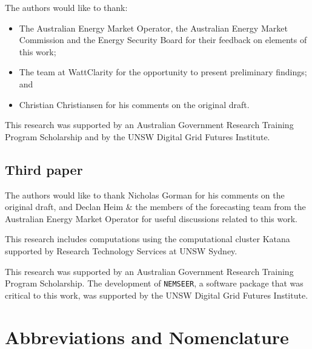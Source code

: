 \documentclass[12pt,a4paper,]{report}
\providecommand{\tightlist}{%
  \setlength{\itemsep}{0pt}\setlength{\parskip}{0pt}}
\begin{document}
The authors would like to thank:

\begin{itemize}
\tightlist
\item
  The Australian Energy Market Operator, the Australian Energy Market
  Commission and the Energy Security Board for their feedback on
  elements of this work;
\item
  The team at WattClarity for the opportunity to present preliminary
  findings; and
\item
  Christian Christiansen for his comments on the original draft.
\end{itemize}

This research was supported by an Australian Government Research
Training Program Scholarship and by the UNSW Digital Grid Futures
Institute.

\hypertarget{third-paper}{%
\section*{Third paper}\label{third-paper}}

The authors would like to thank Nicholas Gorman for his comments on the
original draft, and Declan Heim \& the members of the forecasting team
from the Australian Energy Market Operator for useful discussions
related to this work.

This research includes computations using the computational cluster
Katana supported by Research Technology Services at UNSW Sydney.

This research was supported by an Australian Government Research
Training Program Scholarship. The development of \texttt{NEMSEER}, a
software package that was critical to this work, was supported by the
UNSW Digital Grid Futures Institute. \newpage


\tableofcontents

\newpage

\listoffigures

\newpage

\listoftables

\newpage

\hypertarget{abbreviations-and-nomenclature}{%
\chapter*{Abbreviations and
Nomenclature}\label{abbreviations-and-nomenclature}}
\end{document}
